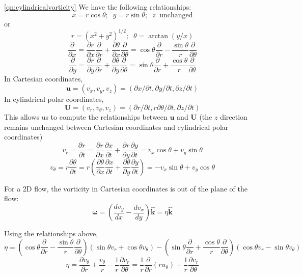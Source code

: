 \documentclass[10pt]{report}
\begin{document}
\begin{answer4}
\begin{questionnumber}{\ref{qn:cylindricalvorticity}}
  We have the following relationships:
\begin{equation}
	x = r \cos\theta; \;\; y = r \sin\theta; \;\; z \;\; \text{unchanged}
\label{eq:xy-rtheta}
\end{equation}
or
\[
    r = ( x^{2} + y^{2} )^{{1/2}}; \;\;  \theta = \arctan (y/x)
\]
\[
    \frac{\partial}{\partial x} = \frac{\partial r}{\partial x}\frac{\partial }{\partial r} +
                                  \frac{\partial \theta}{\partial x}\frac{\partial }{\partial \theta} =
                                  \cos\theta \frac{\partial }{\partial r} -
                                  \frac{\sin\theta}{r}   \frac{\partial }{\partial \theta}
\]
\[
    \frac{\partial}{\partial y} = \frac{\partial r}{\partial y}\frac{\partial }{\partial r} +
                                  \frac{\partial \theta}{\partial y}\frac{\partial }{\partial \theta} =
                                  \sin\theta \frac{\partial }{\partial r} +
                                  \frac{\cos\theta}{r}   \frac{\partial }{\partial \theta}
\]
In Cartesian coordinates,
\[
	{\bm u} = \left( v_{x}, v_{y}, v_{z} \right) =
			  \left( \partial x  / \partial t, \partial y  / \partial t, \partial z / \partial t \right)
\]
In cylindrical polar coordinates,
\[
	{\bm U} = \left( v_{r}, v_{\theta}, v_{z} \right) =
			  \left( \partial r  / \partial t, r \partial \theta  / \partial t, \partial z / \partial t \right)
\]
This allows us to compute the relationships between $\bm u$ and $\bm U$ (the $z$ direction remains unchanged between Cartesian coordinates and cylindrical polar coordinates)
\[
    v_{r} =  \frac{\partial r}{\partial t} = \frac{\partial r}{\partial x}\frac{\partial x}{\partial t} + \frac{\partial r}{\partial y} \frac{\partial y}{\partial t} = v_{x} \cos\theta + v_{y} \sin\theta
\]
\[
    v_{\theta} = r \frac{\partial \theta}{\partial t} = r \left( \frac{\partial \theta}{\partial x}\frac{\partial x}{\partial t} +  \frac{\partial \theta}{\partial y} \frac{\partial y}{\partial t}\right) = - v_{x} \sin\theta + v_{y} \cos\theta
\]

For a 2D flow, the vorticity in Cartesian coordinates is out of the plane of the flow:
\[
	{\bm \omega} = \left( \frac{d v_{y}}{dx} - \frac{d v_{x}}{dy} \right) \hat{\bm k} = \eta \hat{\bm k}
\]

Using the relationships above,
\[
	\eta = \left(  \cos\theta \frac{\partial }{\partial r} -
                   \frac{\sin\theta}{r}   \frac{\partial }{\partial \theta}  \right)
           ( \sin\theta v_{r} + \cos\theta v_{\theta} ) -
           \left(  \sin\theta \frac{\partial }{\partial r} +
                   \frac{\cos\theta}{r}   \frac{\partial }{\partial \theta}  \right)
           ( \cos\theta v_{r} - \sin\theta v_{\theta} )
\]
\[
	\eta = \frac{\partial v_{\theta}}{\partial r} + \frac{v_{\theta}}{r} -
		\frac{1}{r}\frac{\partial v_{r}}{\partial \theta} =
		\frac{1}{r}\frac{\partial}{\partial r}(r u_{\theta}) +
		\frac{1}{r}\frac{\partial v_{r}}{\partial \theta}
\]


\end{questionnumber}
\end{answer4}
\end{document}
